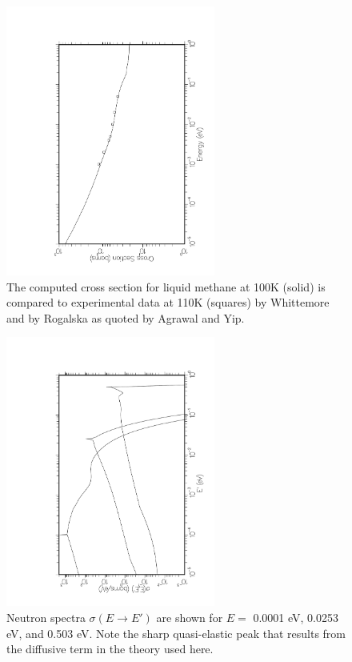 \begin{figure}[t]\centering
\includegraphics[keepaspectratio, height=3.5in, angle=270]{figs/le8ack}
\caption[Cross section for liquid methane at 100K]{The computed cross
 section for liquid methane at 100K (solid) is compared to experimental data
 at 110K (squares) by Whittemore and by Rogalska as quoted by Agrawal
 and Yip.}
\label{fig8}
\end{figure}

\begin{figure}[b]\centering
\includegraphics[keepaspectratio, height=3.5in, angle=270]{figs/le9ack}
\caption[Neutron Spectra for liquid methane]{Neutron spectra
 $\sigma(E{\rightarrow}E')$ are shown for $E=$ 0.0001 eV, 0.0253 eV, and 0.503
 eV.  Note the sharp quasi-elastic peak that results from the diffusive
 term in the theory used here.}
\label{fig9}
\end{figure}

